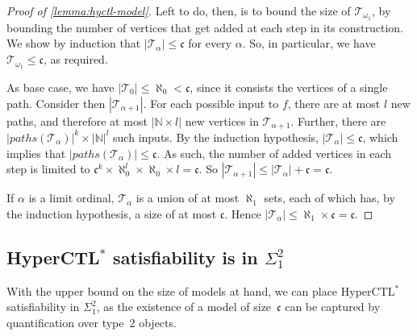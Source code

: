 \documentclass[dvipsnames,10pt,a4paper]{amsart}
\theoremstyle{definition}
\theoremstyle{remark}
\newcommand{\nats}{\mathbb{N}}
\newcommand{\size}[1]{|#1|}
\newcommand{\cont}{\mathfrak{c}}
\newcommand{\tsys}{\mathcal{T}}
\newcommand{\hyctlstar}{{HyperCTL$^*$}\xspace}
\begin{document}
\begin{proof}[Proof of \autoref{lemma:hyctl-model}]
Left to do, then, is to bound the size of $\tsys_{\omega_1}$, by bounding the number of vertices that get added at each step in its construction. We show by induction that $\size{\tsys_\alpha}\leq \cont$ for every $\alpha$. So, in particular, we have $\tsys_{\omega_1} \le \cont$, as required.

As base case, we have $\size{\tsys_{0}}
\le \aleph_0 < \cont$, since it consists the vertices of a single path. 
Consider then $\size{\tsys_{\alpha+1}}$. For each possible input to $f$, there are at most $l$ new paths, and therefore at most $\size{\nats \times l}$ new vertices in $\tsys_{\alpha+1}$. Further, there are $\size{\mathit{paths}(\tsys_\alpha)}^k\times \size{\mathbb{N}}^l$ such inputs. By the induction hypothesis, $\size{\tsys_\alpha}\leq \cont$, which implies that $\size{\mathit{paths}(\tsys_\alpha)}\leq \cont$. As such, the number of added vertices in each step is limited to $\cont^k\times \aleph_0^l \times \aleph_0\times l= \cont$. So $\size{\tsys_{\alpha+1}}\leq \size{\tsys_\alpha}+\cont=\cont$.

If $\alpha$ is a limit ordinal, $\tsys_\alpha$ is a union of at most $\aleph_1$ sets, each of which has, by the induction hypothesis, a size of at most $\cont$. Hence $\size{\tsys_\alpha}\leq \aleph_1\times \cont = \cont$.
\end{proof}


\subsection{\texorpdfstring{\hyctlstar}{HyperCTL*} satisfiability is in \texorpdfstring{$\Sigma^2_1$}{Sigma21}}
\label{subsec:hyctlub}

With the upper bound on the size of models at hand, we can place \hyctlstar satisfiability in $\Sigma_1^2$, as the existence of a model of size~$\cont$ can be captured by quantification over type~$2$ objects.
\end{document}
